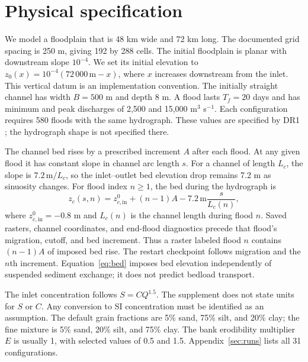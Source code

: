 \documentclass[11pt]{article}
\begin{document}
\section{Physical specification}
We model a floodplain that is 48 km wide and 72 km long. The documented
grid spacing is 250 m, giving 192 by 288 cells. The initial floodplain is
planar with downstream slope $10^{-4}$. We set its initial elevation to
$z_0(x)=10^{-4}(72\,000\,\mathrm{m}-x)$, where $x$ increases downstream
from the inlet. This vertical datum is an implementation convention.
The initially straight channel has
width $B=500$ m and depth 8 m. A flood lasts $T_f=20$ days and has minimum
and peak discharges of 2,500 and 15,000 m$^3$ s$^{-1}$. Each configuration
requires 580 floods with the same hydrograph. These values are specified
by DR1 \cite{supplement}; the hydrograph shape is not specified there.

The channel bed rises by a prescribed increment $A$ after each flood.
At any given flood it has constant slope in channel arc length $s$.
For a channel of length $L_c$, the slope is $7.2\,\mathrm{m}/L_c$, so the
inlet--outlet bed elevation drop remains 7.2 m as sinuosity changes.
For flood index $n\geq1$, the bed during the hydrograph is
\begin{equation}
 z_c(s,n)=z_{c,\mathrm{in}}^0+(n-1)A
          -7.2\,\mathrm{m}\frac{s}{L_c(n)},
 \label{eq:bed}
\end{equation}
where $z_{c,\mathrm{in}}^0=-0.8$ m and $L_c(n)$ is the channel length
during flood $n$. Saved rasters, channel coordinates, and end-flood
diagnostics precede that flood's migration, cutoff, and bed increment.
Thus a raster labeled flood $n$ contains $(n-1)A$ of imposed bed rise.
The restart checkpoint follows migration and the $n$th increment.
Equation~\eqref{eq:bed} imposes bed elevation independently of suspended
sediment exchange; it does not predict bedload transport.

The inlet concentration follows $S=CQ^{1.5}$. The supplement does not
state units for $S$ or $C$. Any conversion to SI concentration must be
identified as an assumption. The default grain fractions are 5\% sand,
75\% silt, and 20\% clay; the fine mixture is 5\% sand, 20\% silt, and
75\% clay. The bank erodibility multiplier $E$ is usually 1, with selected
values of 0.5 and 1.5. Appendix~\ref{sec:runs} lists all 31 configurations.
\end{document}
